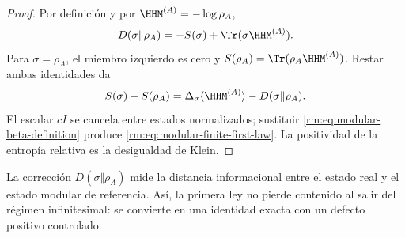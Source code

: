 \begin{proof}
Por definici\'on y por \(\HHM^{(A)}=-\log\rho_A\),
\[
D(\sigma\Vert\rho_A)
=-S(\sigma)+\Tr(\sigma\HHM^{(A)}).
\]
Para \(\sigma=\rho_A\), el miembro izquierdo es cero y
\(S(\rho_A)=\Tr(\rho_A\HHM^{(A)})\). Restar ambas identidades da
\[
S(\sigma)-S(\rho_A)
=\Delta_\sigma\langle\HHM^{(A)}\rangle
-D(\sigma\Vert\rho_A).
\]
El escalar \(cI\) se cancela entre estados normalizados; sustituir
\cref{rm:eq:modular-beta-definition} produce
\cref{rm:eq:modular-finite-first-law}. La positividad de la entrop\'ia
relativa es la desigualdad de Klein.
\end{proof}

La correcci\'on \(D(\sigma\Vert\rho_A)\) mide la distancia informacional
entre el estado real y el estado modular de referencia. As\'i, la primera
ley no pierde contenido al salir del r\'egimen infinitesimal: se convierte
en una identidad exacta con un defecto positivo controlado.
